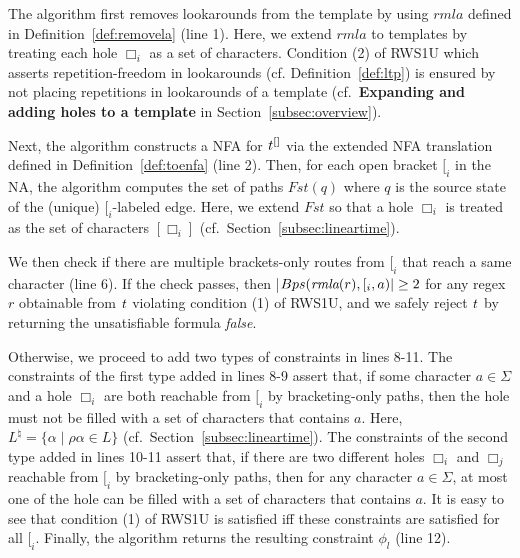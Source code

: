 \documentclass[conference]{IEEEtran}
\newcommand{\hole}{\Box}
\newcommand{\sstate}{{\it t}}
\newcommand{\computePath}{{\sc Bps}}
\newcommand{\follow}{\textit{Fst}}
\newcommand{\ltp}{RWS1U}
\newcommand{\removela}{\textit{rmla}}
\begin{document}
The algorithm first removes lookarounds from the template by using $\removela$ defined in Definition~\ref{def:removela} (line 1).  Here, we extend $\removela$ to templates by treating each hole $\hole_i$ as a set of characters.  Condition (2) of \ltp{} which asserts repetition-freedom in lookarounds (cf. Definition~\ref{def:ltp}) is ensured by not placing repetitions in lookarounds of a template (cf.~\textbf{Expanding and adding holes to a template} in Section~\ref{subsec:overview}).

Next, the algorithm constructs a NFA for $\sstate{}^{[]}$ via the extended NFA translation defined in Definition~\ref{def:toenfa} (line 2). Then, for each open bracket $[_i$ in the {NA}, the algorithm computes the set of paths $\follow(q)$ where $q$ is the source state of the (unique) $[_i$-labeled edge.  Here, we extend $\follow$ so that a hole $\hole_i$ is treated as the set of characters $[\hole_i]$ (cf.~Section~\ref{subsec:lineartime}).  


We then check if there are multiple brackets-only routes from $[_i$ that reach a same character (line 6).  If the check passes, then |$\computePath(\removela(r), [_i, a)| \geq 2$ for any regex $r$ obtainable from $\sstate$ violating condition (1) of \ltp{}, and we safely reject $\sstate$ by returning the unsatisfiable formula {\it false}.  

Otherwise, we proceed to add two types of constraints in lines 8-11.  The constraints of the first type added in lines 8-9 assert that, if some character $a \in \Sigma$ and a hole $\hole_i$ are both reachable from $[_i$ by bracketing-only paths, then the hole must not be filled with a set of characters that contains $a$.  Here, $L^{\natural} = \{\alpha \mid \rho\alpha \in L\}$  (cf.~Section~\ref{subsec:lineartime}).  The constraints of the second type added in lines 10-11 assert that, if there are two different holes $\hole_i$ and $\hole_j$ reachable from $[_i$ by bracketing-only paths, then for any character $a \in \Sigma$, at most one of the hole can be filled with a set of characters that contains $a$.  It is easy to see that condition (1) of \ltp{} is satisfied iff these constraints are satisfied for all $[_i$.
Finally, the algorithm returns the resulting constraint $\phi_l$ (line 12).
\end{document}

